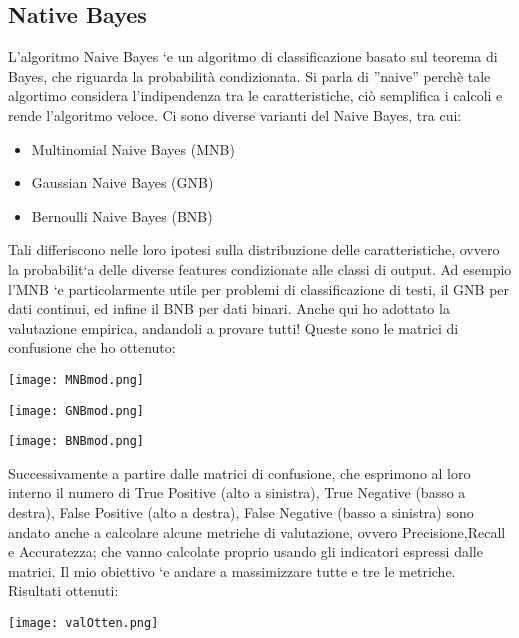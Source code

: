 \documentclass{article}
\begin{document}
\subsection{Native Bayes}
L’algoritmo Naive Bayes `e un algoritmo di classificazione basato sul teorema di Bayes, che
riguarda la probabilità condizionata. Si parla di ”naive” perchè tale algortimo considera l’indipendenza tra le caratteristiche, ciò semplifica i calcoli e rende l’algoritmo veloce. Ci sono diverse varianti del Naive Bayes, tra cui:
\begin{itemize}
    \item Multinomial Naive Bayes (MNB)
    \item Gaussian Naive Bayes (GNB)
    \item Bernoulli Naive Bayes (BNB)
\end{itemize}
Tali differiscono nelle loro ipotesi sulla distribuzione delle caratteristiche, ovvero la probabilit`a delle diverse features condizionate alle classi di output. Ad esempio l’MNB `e particolarmente utile per problemi di classificazione di testi, il GNB per dati continui, ed infine il BNB per dati binari. Anche qui ho adottato la valutazione empirica, andandoli a provare tutti!
Queste sono le matrici di confusione che ho ottenuto:
\begin{center}
  \texttt{[image: MNBmod.png]}
\end{center}
\begin{center}
  \texttt{[image: GNBmod.png]}
\end{center}
\begin{center}
  \texttt{[image: BNBmod.png]}
\end{center}
Successivamente a partire dalle matrici di confusione, che esprimono al loro interno il numero di True Positive (alto a sinistra), True Negative (basso a destra), False Positive (alto a destra), False Negative (basso a sinistra) sono andato anche a calcolare alcune metriche di valutazione, ovvero Precisione,Recall e Accuratezza; che vanno calcolate proprio usando gli indicatori espressi dalle matrici. Il mio obiettivo `e andare a massimizzare tutte e tre le metriche.
Risultati ottenuti:
\begin{center}
  \texttt{[image: valOtten.png]}
\end{center}
\end{document}
